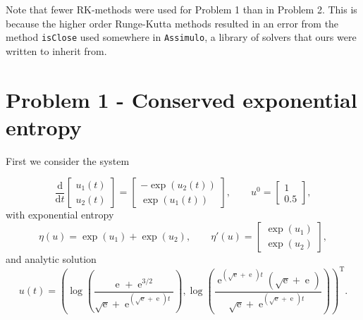 \documentclass{report}
\renewcommand{\exp}[1]{\operatorname{e}^{#1}}
\newcommand{\expalt}{\operatorname{exp}}
\newcommand{\T}{\mathrm{T}}
\begin{document}
    \vspace*{5mm}
    Note that fewer RK-methods were used for Problem 1 than in Problem 2. This is because the higher order Runge-Kutta methods resulted in an error from the method \texttt{isClose} used somewhere in \texttt{Assimulo}, a library of solvers that ours were written to inherit from.


\section{Problem 1 - Conserved exponential entropy}
    First we consider the system

    \[\frac{\text{d}}{\text{d}t}
    \begin{bmatrix}
        u_1(t)\\
        u_2(t)
    \end{bmatrix} =
    \begin{bmatrix}
        -\expalt(u_2(t))\\
        \expalt(u_1(t))
    \end{bmatrix}, \qquad u^0 =
    \begin{bmatrix}
        1\\
        0.5
    \end{bmatrix},
    \]
    with exponential entropy
    \[\eta(u) = \expalt(u_1) + \expalt(u_2), \qquad \eta'(u) =
    \begin{bmatrix}
        \expalt(u_1)\\
        \expalt(u_2)
    \end{bmatrix},
    \]
    and analytic solution
    \[u(t) = \left(\log\left(\frac{\exp{} + \exp{3/2}}{\sqrt{\exp{}} + \exp{(\sqrt{\exp{}}+\exp{})t}}\right), \log\left(\frac{\exp{(\sqrt{\exp{}}+\exp{})t}(\sqrt{\exp{}}+\exp{})}{\sqrt{\exp{}} + \exp{(\sqrt{\exp{}}+\exp{})t}}\right)\right)^{\T}.\]
\end{document}
